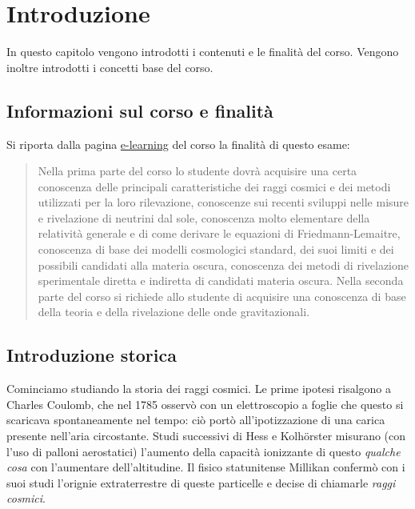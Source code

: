 \chapterspaceabove{6.75cm} %
\chapterspacebelow{7.25cm} %


\chapter{Introduzione}

In questo capitolo vengono introdotti i contenuti e le finalità del corso. Vengono inoltre introdotti i concetti base del corso.


\section{Informazioni sul corso e finalità}

Si riporta dalla pagina \href{https://elearning.df.unipi.it/course/view.php?id=237}{e-learning} del corso la finalità di questo esame:
\begin{quote}
    Nella prima parte del corso lo studente dovrà acquisire una certa conoscenza delle principali caratteristiche dei raggi cosmici e dei metodi utilizzati per la loro rilevazione, conoscenze sui recenti sviluppi nelle misure e rivelazione di neutrini dal sole, conoscenza molto elementare della relatività generale e di come derivare le equazioni di Friedmann-Lemaitre, conoscenza di base dei modelli cosmologici standard, dei suoi limiti e dei possibili candidati alla materia oscura, conoscenza dei metodi di rivelazione sperimentale diretta e indiretta di candidati materia oscura. 
    Nella seconda parte del corso si richiede allo studente di acquisire una conoscenza di base della teoria e della rivelazione delle onde gravitazionali.
\end{quote}

\section{Introduzione storica}

Cominciamo studiando la storia dei raggi cosmici. Le prime ipotesi risalgono a Charles Coulomb, che nel 1785 osservò con un elettroscopio a foglie che questo si scaricava spontaneamente nel tempo: ciò portò all'ipotizzazione di una carica presente nell'aria circostante. Studi successivi di Hess e Kolhörster misurano (con l'uso di palloni aerostatici) l'aumento della capacità ionizzante di questo \emph{qualche cosa} con l'aumentare dell'altitudine. Il fisico statunitense Millikan confermò con i suoi studi l'orignie extraterrestre di queste particelle e decise di chiamarle \emph{raggi cosmici}. 


